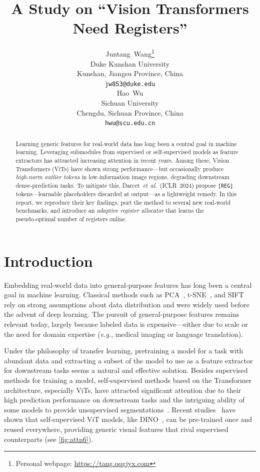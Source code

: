 \documentclass{article}
\title{A Study on ``Vision Transformers Need Registers''}
\author{%
  Juntang~Wang\thanks{Personal webpage: \url{https://tang.qqgjyx.com}} \\
  Duke Kunshan University\\
  Kunshan, Jiangsu Province, China \\
  \texttt{jw853@duke.edu} \\
  \And
  Hao~Wu \\
  Sichuan University \\
  Chengdu, Sichuan Province, China \\
  \texttt{hwu@scu.edu.cn}
}
\newcommand{\RegTok}{\texttt{[REG]}\xspace}
\newcommand{\citep}{\parencite}
\begin{document}
\maketitle


\begin{abstract}
    Learning generic features for real-world data has long been a central goal in machine learning.
    Leveraging submodules from supervised or self-supervised models as feature extractors has attracted increasing attention in recent years.
    Among these, Vision Transformers (ViTs) have shown strong performance—but occasionally produce \emph{high‑norm outlier tokens} in low‑information image regions, degrading downstream dense‑prediction tasks.
    To mitigate this, Darcet~\textit{et al.} (ICLR 2024) propose \RegTok tokens—learnable placeholders discarded at output—as a lightweight remedy. 
    In this report, we reproduce their key findings, port the method to several new real‑world benchmarks, and introduce an \emph{adaptive register allocator} that learns the pseudo‑optimal number of registers online.
\end{abstract}


\section{Introduction}
\label{sec:intro}
Embedding real-world data into general-purpose features has long been a central goal in machine learning. Classical methods such as PCA~\citep{jolliffePrincipalComponentAnalysis1986}, t-SNE~\citep{maatenVisualizingDataUsing2008}, and SIFT~\citep{loweDistinctiveImageFeatures2004} rely on strong assumptions about data distribution and were widely used before the advent of deep learning. The pursuit of general-purpose features remains relevant today, largely because labeled data is expensive—either due to scale or the need for domain expertise (\emph{e.g.}, medical imaging or language translation).

Under the philosophy of transfer learning, pretraining a model for a task with abundant data and extracting a subset of the model to use as a feature extractor for downstream tasks seems a natural and effective solution.
Besides supervised methods for training a model, self-supervised methods based on the Transformer architecture, especially ViTs, have attracted significant attention due to their high prediction performance on downstream tasks and the intriguing ability of some models to provide unsupervised segmentations~\citep{caronEmergingPropertiesSelfsupervised2021}.
Recent studies~\citep{caronEmergingPropertiesSelfsupervised2021,oquabDINOv2LearningRobust2024} have shown that self-supervised ViT models, like DINO~\cite{caronEmergingPropertiesSelfsupervised2021}, can be pre-trained once and reused everywhere, providing generic visual features that rival supervised counterparts (see \cref{fig:attn6}).
\end{document}
